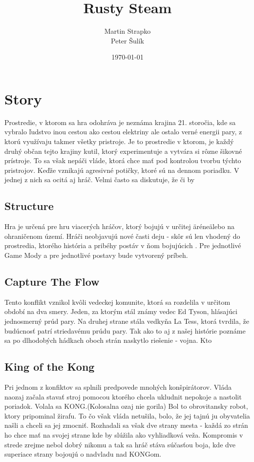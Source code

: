 \documentclass[a4paper]{report}
\title{Rusty Steam}
\author{Martin Strapko \\ Peter Šulík}
\date{\today}
\begin{document}
\maketitle

\tableofcontents
 
\chapter{Story}
Prostredie, v ktorom sa hra odohráva je neznáma krajina 21. storočia, kde sa vybralo ľudstvo inou cestou ako cestou elektriny ale ostalo verné energii pary, z ktorú využívaju takmer všetky pristroje. Je to  prostredie v ktorom, je každý druhý občan tejto krajiny kutil, ktorý experimentuje a vytvára si rôzne šikovné prístroje. To sa však nepáči vláde, ktorá chce mať pod kontrolou tvorbu týchto pristrojov. Keďže vznikajú agresivné potičky, ktoré sú na dennom poriadku. V jednej z nich sa ocitá aj hráč. Velmi často sa diskutuje, že či by 
\section{Structure}
Hra je určená pre hru viacerých hráčov, ktorý bojujú v určitej \"aréne\" alebo na ohraničenom území. Hráči neobjavujú nové časti deju - skôr sú len vhodený do prostredia, ktorého história a pribéhy postáv v ňom bojujúcich . Pre jednotlivé Game Mody a pre jednotlivé postavy bude vytvorený príbeh.
\section{Capture The Flow}
Tento konflikt vznikol kvôli vedeckej komunite, ktorá sa rozdelila v určitom období na dva smery. Jeden, za ktorým stál známy vedec Ed Tyson, hlásajúci jednosmerný prúd pary. Na druhej strane stála vedkyňa La Tess, ktorá tvrdila, že budúcnosť patrí striedavému prúdu pary. Tak ako to aj z našej histórie poznáme sa po dlhodobých hádkach oboch strán naskytlo riešenie - vojna. Kto

\section{King of the Kong}
Pri jednom z konfiktov sa splnili predpovede mnohých konšpirátorov. Vláda naozaj začala stavať stroj pomocou ktorého chcela ukludnit nepokoje a nastolit poriadok. Volala sa KONG.(Kolosalna ozaj nie gorila) Bol to obrovitansky robot, ktory pripominal žirafu. To čo však vláda netušila, bolo, že jej tajnú ju obyvatelia našli a chceli sa jej zmocniť. Rozhadali sa však dve strany mesta - každá zo strán ho chce mať na svojej strane kde by slúžila ako vyhliadková veža. Kompromis v strede zrejme nebol dobrý nikomu a tak sa hráč stáva súčasťou boja, kde dve superiace strany bojoujú o nadvladu nad KONGom.
\end{document}
